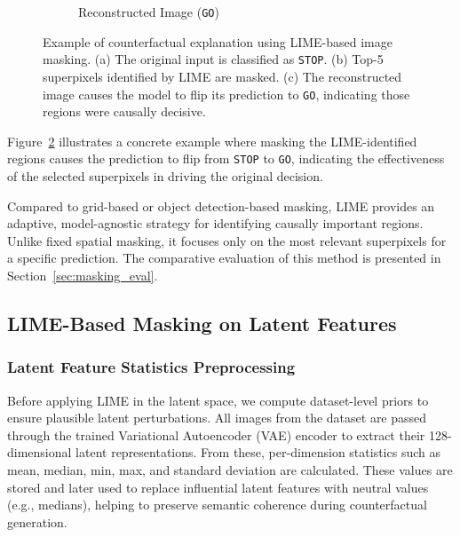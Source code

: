 \begin{figure}[htbp]
\begin{subfigure}[b]{0.3\textwidth}
    \caption{Reconstructed Image (\texttt{GO})}
    \label{fig:lime_recon}
\end{subfigure}
\caption[Example of counterfactual via LIME on images]{%
Example of counterfactual explanation using LIME-based image masking. (a) The original input is classified as \texttt{STOP}. (b) Top-5 superpixels identified by LIME are masked. (c) The reconstructed image causes the model to flip its prediction to \texttt{GO}, indicating those regions were causally decisive.}
\label{fig:lime_image_example}
\end{figure}




Figure~\ref{fig:lime_image_example} illustrates a concrete example where masking the LIME-identified regions causes the prediction to flip from \texttt{STOP} to \texttt{GO}, indicating the effectiveness of the selected superpixels in driving the original decision.



Compared to grid-based or object detection-based masking, LIME provides an adaptive, model-agnostic strategy for identifying causally important regions. Unlike fixed spatial masking, it focuses only on the most relevant superpixels for a specific prediction. The comparative evaluation of this method is presented in Section~\ref{sec:masking_eval}.





\clearpage
\subsection{LIME-Based Masking on Latent Features} \label{sec:lime_based_masking_on_latent_features}

\subsubsection*{Latent Feature Statistics Preprocessing}
\label{sec:latent_statistics_preprocessing}

Before applying LIME in the latent space, we compute dataset-level priors to ensure plausible latent perturbations. All images from the dataset are passed through the trained Variational Autoencoder (VAE) encoder to extract their 128-dimensional latent representations. From these, per-dimension statistics such as mean, median, min, max, and standard deviation are calculated. These values are stored and later used to replace influential latent features with neutral values (e.g., medians), helping to preserve semantic coherence during counterfactual generation.




